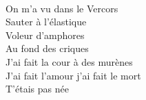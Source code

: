\\
On m'a vu dans le Vercors \\
Sauter à l'élastique \\
Voleur d'amphores \\
Au fond des criques \\
J'ai fait la cour à des murènes \\
J'ai fait l'amour j'ai fait le mort \\
T'étais pas née \\
